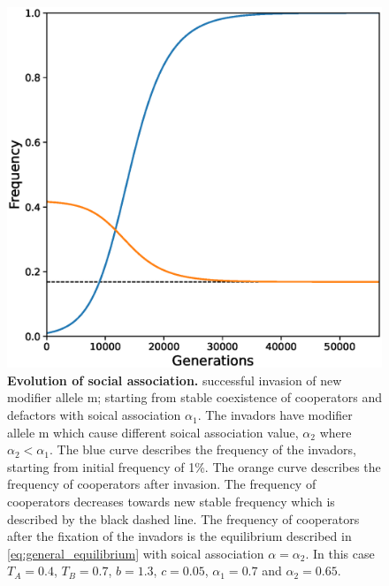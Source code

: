 \documentclass[12pt]{extarticle}
\begin{document}
\begin{figure}[b]
  \centering
   \includegraphics[scale=0.5]{Frequency_of_invadors.eps}
  \caption{
  \textbf{Evolution of social association.} successful invasion of new modifier allele m; starting from stable coexistence of cooperators and defactors with soical association $\alpha_1$. 
  The invadors have modifier allele m which cause different soical association value, $\alpha_2$ where $\alpha_2<\alpha_1$.
  The blue curve describes the frequency of the invadors, starting from initial frequency of 1\%.
  The orange curve describes the frequency of cooperators after invasion. The frequency of cooperators decreases towards new stable frequency which is described by the black dashed line. 
  The frequency of cooperators after the fixation of the invadors is the equilibrium described in \autoref{eq:general_equilibrium} with soical association $\alpha=\alpha_2$.
  In this case $T_A = 0.4$, $T_B = 0.7$, $b=1.3$, $c=0.05$, $\alpha_1 = 0.7$ and $\alpha_2 = 0.65$.
  }
  \label{fig:invasion}
\end{figure}
\end{document}
